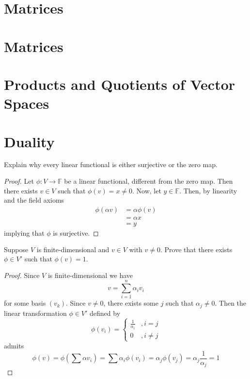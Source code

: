 \section{\label{3.C} Matrices}

\section{\label{3.D} Matrices}

\section{\label{3.E} Products and Quotients of Vector Spaces}

\section{\label{3.F} Duality}

\begin{exercise} \label{3.F.1}
    Explain why every linear functional is either surjective or the zero map.
    
    \begin{proof}
        Let \( \phi: V \rightarrow \mathbb{F} \) be a linear functional, different from the zero map. Then there exists \( v \in V \) such that \( \phi(v) = x \neq 0 \). Now, let \( y \in \mathbb{F} \). Then, by linearity and the field axioms
        \begin{align*}
            \phi(\alpha v) &= \alpha \phi(v) \\
            &= \alpha x \\
            &= y
        \end{align*}
        implying that \( \phi \) is surjective.
    \end{proof}
\end{exercise}

\begin{exercise} \label{3.F.2}

\end{exercise}

\begin{exercise} \label{3.F.3}
    Suppose \( V \) is finite-dimensional and \( v \in V \) with \( v \neq 0 \). Prove that there exists \( \phi \in V' \) such that \( \phi(v) = 1 \).
    
    \begin{proof}
        Since \( V \) is finite-dimensional we have
        \[ v = \sum_{i=1}^n \alpha_i v_i \]
        for some basis \( (v_k) \). Since \( v \neq 0 \), there exists some \( j \) such that \( \alpha_j \neq 0 \). Then the linear transformation \( \phi \in V' \) defined by
        \[ \phi(v_i) = \begin{cases} \frac{1}{\alpha_i} & ,i=j \\ 0 & ,i \neq j \end{cases} \]
        admits
        \[ \phi(v) = \phi\left(\sum \alpha v_i\right) = \sum \alpha_i \phi(v_i) = \alpha_j \phi(v_j) = \alpha_j \frac{1}{\alpha_j} = 1 \]
    \end{proof}
\end{exercise}

